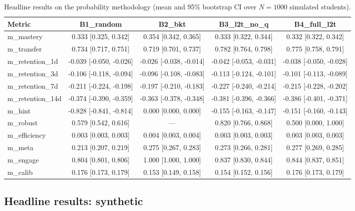 \begin{table}
\centering
\begin{tabular}{lcccc}
\hline
Metric & B1\_random & B2\_bkt & B3\_l2t\_no\_q & B4\_full\_l2t \\
\hline
m\_mastery & 0.333 [0.325, 0.342] & 0.354 [0.342, 0.365] & 0.333 [0.322, 0.344] & 0.332 [0.322, 0.342] \\
m\_transfer & 0.734 [0.717, 0.751] & 0.719 [0.701, 0.737] & 0.782 [0.764, 0.798] & 0.775 [0.758, 0.791] \\
m\_retention\_1d & -0.039 [-0.050, -0.026] & -0.026 [-0.038, -0.014] & -0.042 [-0.053, -0.031] & -0.038 [-0.050, -0.028] \\
m\_retention\_3d & -0.106 [-0.118, -0.094] & -0.096 [-0.108, -0.083] & -0.113 [-0.124, -0.101] & -0.101 [-0.113, -0.089] \\
m\_retention\_7d & -0.211 [-0.224, -0.198] & -0.197 [-0.210, -0.183] & -0.227 [-0.240, -0.214] & -0.215 [-0.228, -0.202] \\
m\_retention\_14d & -0.374 [-0.390, -0.359] & -0.363 [-0.378, -0.348] & -0.381 [-0.396, -0.366] & -0.386 [-0.401, -0.371] \\
m\_hint & -0.828 [-0.841, -0.814] & 0.000 [0.000, 0.000] & -0.155 [-0.163, -0.147] & -0.151 [-0.160, -0.143] \\
m\_robust & 0.579 [0.542, 0.616] & — & 0.820 [0.766, 0.868] & 0.500 [0.000, 1.000] \\
m\_efficiency & 0.003 [0.003, 0.003] & 0.004 [0.003, 0.004] & 0.003 [0.003, 0.003] & 0.003 [0.003, 0.003] \\
m\_meta & 0.213 [0.207, 0.219] & 0.275 [0.267, 0.283] & 0.273 [0.266, 0.281] & 0.277 [0.269, 0.285] \\
m\_engage & 0.804 [0.801, 0.806] & 1.000 [1.000, 1.000] & 0.837 [0.830, 0.844] & 0.844 [0.837, 0.851] \\
m\_calib & 0.176 [0.173, 0.179] & 0.153 [0.149, 0.158] & 0.154 [0.152, 0.156] & 0.176 [0.173, 0.179] \\
\hline
\end{tabular}
\caption{Headline results on the probability methodology (mean and 95\% bootstrap CI over $N=1000$ simulated students).}
\label{tab:headline-probability}
\end{table}

\subsection{Headline results: synthetic}

